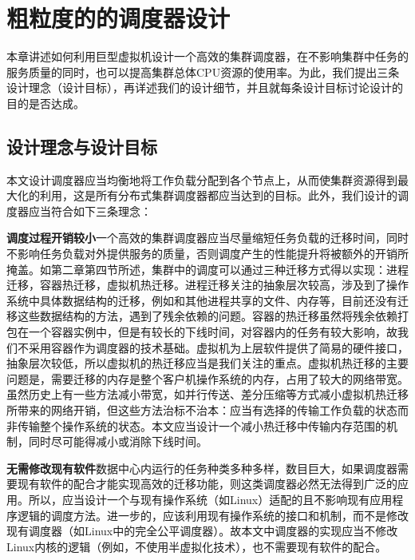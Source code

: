 
\chapter{粗粒度的的调度器设计}
\label{chap:LB}
本章讲述如何利用巨型虚拟机设计一个高效的集群调度器，在不影响集群中任务的服务质量的同时，也可以提高集群总体CPU资源的使用率。为此，我们提出三条设计理念（设计目标），再详述我们的设计细节，并且就每条设计目标讨论设计的目的是否达成。
\section{设计理念与设计目标}
本文设计调度器应当均衡地将工作负载分配到各个节点上，从而使集群资源得到最大化的利用，这是所有分布式集群调度器都应当达到的目标。此外，我们设计的调度器应当符合如下三条理念：

\noindent\textbf{调度过程开销较小}\quad 一个高效的集群调度器应当尽量缩短任务负载的迁移时间，同时不影响任务负载对外提供服务的质量，否则调度产生的性能提升将被额外的开销所掩盖。如第二章第四节所述，集群中的调度可以通过三种迁移方式得以实现：进程迁移，容器热迁移，虚拟机热迁移。进程迁移关注的抽象层次较高，涉及到了操作系统中具体数据结构的迁移，例如和其他进程共享的文件、内存等，目前还没有迁移这些数据结构的方法，遇到了残余依赖的问题。容器的热迁移虽然将残余依赖打包在一个容器实例中，但是有较长的下线时间，对容器内的任务有较大影响，故我们不采用容器作为调度器的技术基础。虚拟机为上层软件提供了简易的硬件接口，抽象层次较低，所以虚拟机的热迁移应当是我们关注的重点。虚拟机热迁移的主要问题是，需要迁移的内存是整个客户机操作系统的内存，占用了较大的网络带宽。虽然历史上有一些方法减小带宽，如并行传送\cite{parallelm}、差分压缩\cite{compression}等方式减小虚拟机热迁移所带来的网络开销，但这些方法治标不治本：应当有选择的传输工作负载的状态而非传输整个操作系统的状态。本文应当设计一个减小热迁移中传输内存范围的机制，同时尽可能得减小或消除下线时间。

\noindent\textbf{无需修改现有软件}\quad 数据中心内运行的任务种类多种多样，数目巨大，如果调度器需要现有软件的配合才能实现高效的迁移功能，则这类调度器必然无法得到广泛的应用。所以，应当设计一个与现有操作系统（如Linux）适配的且不影响现有应用程序逻辑的调度方法。进一步的，应该利用现有操作系统的接口和机制，而不是修改现有调度器（如Linux中的完全公平调度器）。故本文中调度器的实现应当不修改Linux内核的逻辑（例如，不使用半虚拟化技术），也不需要现有软件的配合。

